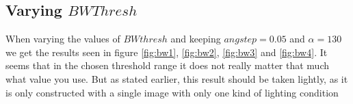\documentclass[a4paper, 20pt]{article}
\begin{document}
\subsection{Varying $BWThresh$}
When varying the values of $BWthresh$ and keeping $angstep = 0.05$ and $\alpha=
130$ we get the results seen in figure \ref{fig:bw1}, \ref{fig:bw2},
\ref{fig:bw3} and \ref{fig:bw4}. It seems that in the chosen threshold range it
does not really matter that much what value you use.
But as stated earlier, this result should be taken lightly, as it is only
constructed with a single image with only one kind of lighting condition
\begin{figure}[!ht]
\centering
\begin{floatrow}
\end{floatrow}
\end{figure}
\end{document}
